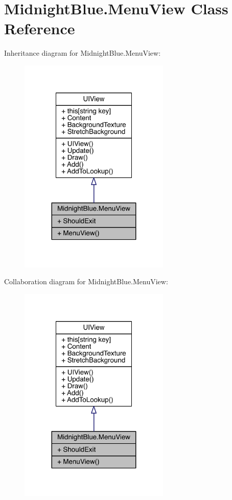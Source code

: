 \hypertarget{class_midnight_blue_1_1_menu_view}{}\section{Midnight\+Blue.\+Menu\+View Class Reference}
\label{class_midnight_blue_1_1_menu_view}


Inheritance diagram for Midnight\+Blue.\+Menu\+View\+:
\nopagebreak
\begin{figure}[H]
\begin{center}
\leavevmode
\includegraphics[width=203pt]{class_midnight_blue_1_1_menu_view__inherit__graph}
\end{center}
\end{figure}


Collaboration diagram for Midnight\+Blue.\+Menu\+View\+:
\nopagebreak
\begin{figure}[H]
\begin{center}
\leavevmode
\includegraphics[width=203pt]{class_midnight_blue_1_1_menu_view__coll__graph}
\end{center}
\end{figure}
